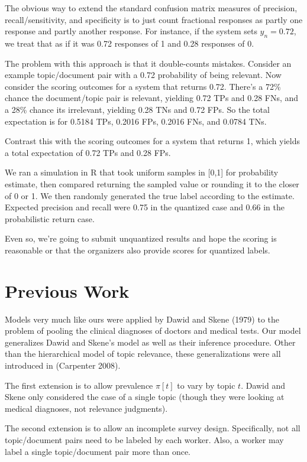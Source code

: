 \documentclass{article}
\begin{document}
The obvious way to extend the standard confusion matrix measures
of precision, recall/sensitivity, and specificity is to just count
fractional responses as partly one response and partly another
response.  For instance, if the system sets $\hat{y}_n = 0.72$,
we treat that as if it was 0.72 responses of 1 and 0.28 responses
of 0. 

The problem with this approach is that it double-counts mistakes.
Consider an example topic/document pair with a 0.72 probability of
being relevant.  Now consider the scoring outcomes for a system that
returns 0.72.  There's a 72\% chance the document/topic pair is
relevant, yielding 0.72 TPs and 0.28 FNs, and a 28\% chance its
irrelevant, yielding 0.28 TNs and 0.72 FPs.  So the total
expectation is for 0.5184 TPs, 0.2016 FPs, 0.2016 FNs, and 
0.0784 TNs.  

Contrast this with the scoring outcomes for a system that returns 1,
which yields a total expectation of 0.72 TPs and 0.28 FPs.

We ran a simulation in R that took uniform samples in [0,1] for
probability estimate, then compared returning the sampled value
or rounding it to the closer of 0 or 1.  We then randomly generated
the true label according to the estimate.  Expected precision and recall were
0.75 in the quantized case and 0.66 in the probabilistic return case.

Even so, we're going to submit unquantized results and hope the
scoring is reasonable or that the organizers also provide scores for
quantized labels.  


\section{Previous Work}

Models very much like ours were applied by Dawid and Skene
(1979) to the problem of pooling the clinical diagnoses of doctors
and medical tests.  Our model generalizes Dawid and Skene's model as
well as their inference procedure.   Other than the hierarchical model
of topic relevance, these generalizations were all introduced in
(Carpenter 2008).

The first extension is to allow prevalence $\pi[t]$ to vary by topic
$t$.  Dawid and Skene only considered the case of a single topic
(though they were looking at medical diagnoses, not relevance
judgments).

The second extension is to allow an incomplete survey design.
Specifically, not all topic/document pairs need to be labeled by each
worker.  Also, a worker may label a single topic/document pair more
than once.
\end{document}

